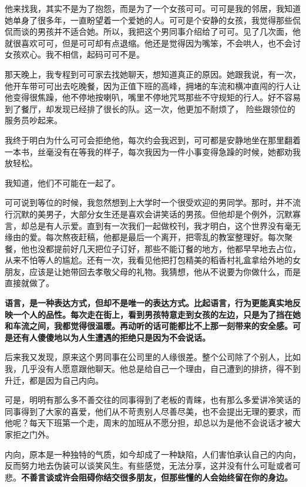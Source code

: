 \documentclass[UTF8,a4paper,8pt]{ctexbook}
\begin{document}
	他来找我，其实不是为了抱怨，而是为了一个女孩可可。可可是我的邻居，我知道她单身了很多年，一直盼望着一个爱她的人。可可是个安静的女孩，我觉得那些侃侃而谈的男孩并不适合她。所以，我把这个男同事介绍给了可可。见了几次面，他就很喜欢可可，但是可可却有点退缩。他还是觉得因为嘴笨，不会哄人，也不会讨女孩欢心。我不相信，起码可可不是。
	
	那天晚上，我专程到可可家去找她聊天，想知道真正的原因。她跟我说，有一次，他开车带可可出去吃晚餐，因为正值下班的高峰，拥堵的车流和横冲直闯的行人让他变得很焦躁，他不停地按喇叭，嘴里不停地咒骂那些不守规矩的行人。好不容易到了餐厅，却发现已经排了很长的队。这一次，他更加不耐烦了， 险些跟领位的服务员吵起来。
	
	我终于明白为什么可可会拒绝他，每次约会我迟到，可可都是安静地坐在那里翻着一本书，丝毫没有在等我的样子，每次我因为一件小事变得急躁的时候，她都劝我放轻松。
	
	我知道，他们不可能在一起了。
	
	可可说到等位的时候，我忽然想到上大学时一个很受欢迎的男同学。那时，并不流行沉默的美男子，大部分女生还是喜欢会讲笑话的男孩。但他却是个例外，沉默寡言，却总是有人示爱。直到有一次我们一起做校刊，我才明白，这个世界没有毫无缘由的爱。每次熬夜赶稿，他都是最后一个离开，把零乱的教室整理好。每次聚餐，他也没都提前好几天把位子订好，那些不能订餐的地方，他都早早地去占位，从来不怕等人的尴尬。还有一次，我看见他把打包精美的稻香村礼盒拿给外地的女朋友，应该是让她带回去孝敬父母的礼物。我猜想，他从不说要为你做什么，而是直接就做了。
	
	\textbf{语言，是一种表达方式，但却不是唯一的表达方式。比起语言，行为更能真实地反映一个人的品性。每次走在街上，看到男孩特意走到女孩的左边，只是为了挡在她和车流之间，我都觉得很温暖。再动听的话可能都比不上那一刻带来的安全感。可是还有人傻傻地以为人生遭遇的拒绝只是因为不会说话。}
	
	后来我又发现，原来这个男同事在公司里的人缘很差。整个公司除了个别人，比如我，几乎没有人愿意跟他聊天。他总是给自己一个理由，自己遭到的排挤，得不到升迁，都是因为自己内向。
	
	可是，明明有那么多不善交往的同事得到了老板的青睐，也有那么多爱讲冷笑话的同事得到了大家的喜爱，他们从不苛责别人尽善尽美，也不会提出无理的要求，而他呢？每天下班第一个走，周末的加班从不愿分担，却总以为是他不会说话才被大家拒之门外。
	
	内向，原本是一种独特的气质，如今却成了一种缺陷，人们害怕承认自己的内向，反而努力地去伪装可以谈笑风生。有些感觉，无法分享，这并没有什么可耻或者可悲。\textbf{不善言谈或许会阻碍你结交很多朋友，但那些懂的人会始终留在你的身边。}
	
\end{document}
